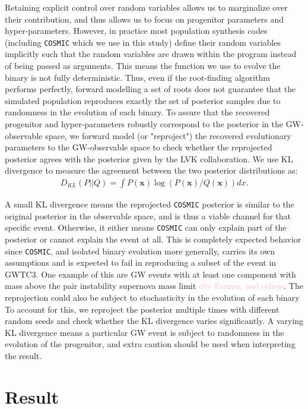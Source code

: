 \documentclass[twocolumn]{aastex631}
\newcommand{\kb}[1]{\textcolor{pink}{#1}}
\begin{document}
Retaining explicit control over random variables allows us to marginalize over their contribution, 
and thus allows us to focus on progenitor parameters and hyper-parameters.
However, in practice most population synthesis codes (including \texttt{COSMIC} which we use in this study) 
define their random variables implicitly such that the random variables are drawn within the program instead of 
being passed as arguments. This means the function we use to evolve the binary is not fully deterministic.
Thus, even if the root-finding algorithm performs perfectly, forward modelling a set of roots does not 
guarantee that the simulated population reproduces exactly the set of posterior samples due to 
randomness in the evolution of each binary. To assure that the recovered progenitor and hyper-parameters 
robustly correspond to the posterior in the GW-observable space, we forward model (or "reproject") the recovered 
evolutionary parameters to the GW-observable space to check whether the reprojected posterior agrees 
with the posterior given by the LVK collaboration. We use KL divergence to measure the agreement between the two posterior 
distributions as:
\begin{align}
D_{KL}(P||Q) = \int P(\bm{x}) \log(P(\bm{x})/Q(\bm{x})) dx.
\label{eq:KLdivergence}
\end{align}


A small KL divergence means the reprojected \texttt{COSMIC} posterior is similar to the original posterior in the 
observable space, and is thus a viable channel for that specific event. Otherwise, it either means \texttt{COSMIC} 
can only explain part of the posterior or cannot explain the event at all. This is completely expected behavior since 
\texttt{COSMIC}, and isolated binary evolution more generally, carries its own assumptions and is expected to 
fail in reproducing a subset of the event in GWTC3. One example of this are GW events with at least one component 
with mass above the pair instability supernova mass limit \kb{cite Farmer, and others}.
The reprojection could also be subject to stochasticity in the evolution of each binary
To account for this, we reproject the posterior multiple times with different random seeds and 
check whether the KL divergence varies significantly. A varying KL divergence means a particular GW event is subject 
to randomness in the evolution of the progenitor, and extra caution should be used when interpreting the result.


\section{Result}
\label{sec:result}
    
\end{document}
